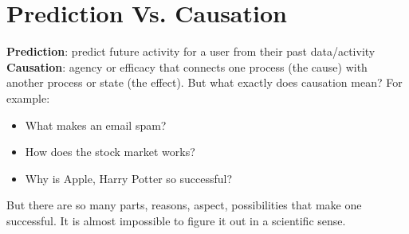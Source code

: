 
\section{Prediction Vs. Causation}
\textbf{Prediction}: predict future activity for a user from their past data/activity\\
\textbf{Causation}:  agency or efficacy that connects one process (the cause) with another process or state (the effect). But what exactly does causation mean? For example:
\begin{itemize}
  \item What makes an email spam?
  \item How does the stock market works?
  \item Why is Apple, Harry Potter so successful?
\end{itemize}
But there are so many parts, reasons, aspect, possibilities that make one successful. It is almost impossible to figure it out in a scientific sense.

